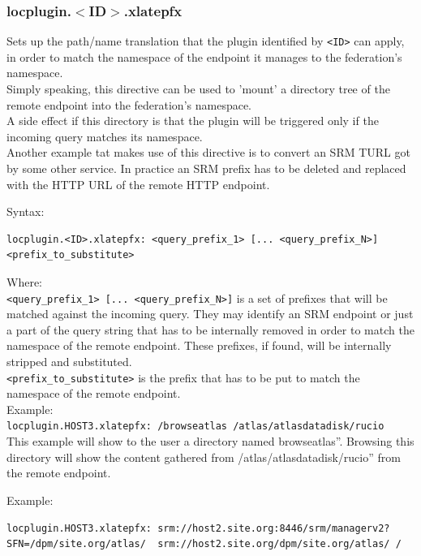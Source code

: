 \documentclass[12pt]{article} %
\begin{document}
\subsubsection{locplugin.$<$ID$>$.xlatepfx}
Sets up the path/name translation that the plugin identified by \lstinline"<ID>" can apply, in order to match the namespace of the endpoint it manages to the federation's namespace.\\
Simply speaking, this directive can be used to 'mount' a directory tree of the remote endpoint into the federation's namespace.\\

A side effect if this directory is that the plugin will be triggered only if the incoming query matches its namespace.\\

Another example tat makes use of this directive is to convert an SRM TURL got by some other service. In practice an SRM prefix has to be deleted and replaced with the HTTP URL of the remote HTTP endpoint.

Syntax:\\
\begin{lstlisting}
locplugin.<ID>.xlatepfx: <query_prefix_1> [... <query_prefix_N>] <prefix_to_substitute>
\end{lstlisting}
Where: \\

\lstinline"<query_prefix_1> [... <query_prefix_N>]" is a set of prefixes that will be matched against the incoming query. They may identify an SRM endpoint or just a part of the query string that has to be internally
removed in order to match the namespace of the remote endpoint. These prefixes, if found, will be internally stripped and substituted.\\

\lstinline"<prefix_to_substitute>" is the prefix that has to be put to match the namespace of the remote endpoint.\\

Example:\\

\lstinline"locplugin.HOST3.xlatepfx: /browseatlas /atlas/atlasdatadisk/rucio"\\

This example will show to the user a directory named \lstinline``browseatlas''. Browsing this directory will show the content gathered from \lstinline``/atlas/atlasdatadisk/rucio'' from the remote endpoint.

Example:\\
\begin{lstlisting}
locplugin.HOST3.xlatepfx: srm://host2.site.org:8446/srm/managerv2?SFN=/dpm/site.org/atlas/  srm://host2.site.org/dpm/site.org/atlas/ /
\end{lstlisting}
\end{document}
